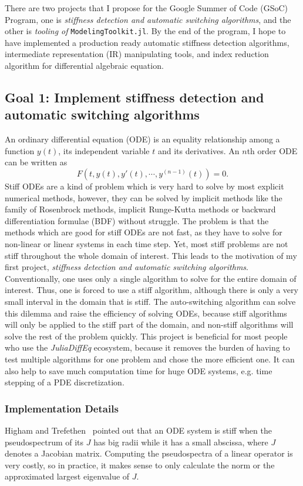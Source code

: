 \documentclass[12pt,a4paper]{article}
\begin{document}
There are two projects that I propose for the Google Summer of Code (GSoC)
Program, one is \textit{stiffness detection and automatic switching
algorithms}, and the other is \textit{tooling of} \texttt{ModelingToolkit.jl}. By
the end of the program, I hope to have implemented a production ready automatic
stiffness detection algorithms, intermediate representation (IR) manipulating
tools, and index reduction algorithm for differential algebraic equation.

\subsection{Goal 1: Implement stiffness detection and automatic switching
algorithms} \label{goal1}
An ordinary differential equation (ODE) is an equality relationship among a
function $y(t)$, its independent variable $t$ and its derivatives. An $n$th
order ODE can be written as
\begin{equation}
  F(t, y(t), y'(t), \cdots, y^{(n-1)}(t)) = 0.
\end{equation}
Stiff ODEs are a kind of problem which is very hard to solve by most explicit
numerical methods, however, they can be solved by implicit methods like the
family of Rosenbrock methods, implicit Runge-Kutta methods or backward
differentiation formulae (BDF) without struggle. The problem is that the
methods which are good for stiff ODEs are not fast, as they have to solve for
non-linear or linear systems in each time step. Yet, most stiff problems are
not stiff throughout the whole domain of interest. This leads to the
motivation of my first project, \textit{stiffness detection and automatic
switching algorithms}. Conventionally, one uses only a single algorithm to
solve for the entire domain of interest. Thus, one is forced to use a stiff
algorithm, although there is only a very small interval in the domain that is
stiff. The auto-switching algorithm can solve this dilemma and raise the
efficiency of solving ODEs, because stiff algorithms will only be applied to
the stiff part of the domain, and non-stiff algorithms will solve the rest of
the problem quickly. This project is beneficial for most people who use the
\textit{JuliaDiffEq} ecosystem, because it removes the burden of having to test
multiple algorithms for one problem and chose the more efficient one. It can
also help to save much computation time for huge ODE systems, e.g. time
stepping of a PDE discretization.

\subsubsection{Implementation Details}
Higham and Trefethen~\cite{stiffode} pointed out that an ODE system is stiff
when the pseudospectrum of its $J$ has big radii while it has a small abscissa,
where $J$ denotes a Jacobian matrix. Computing the pseudospectra of a linear
operator is very costly, so in practice, it makes sense to only calculate the norm
or the approximated largest eigenvalue of $J$.
\end{document}
